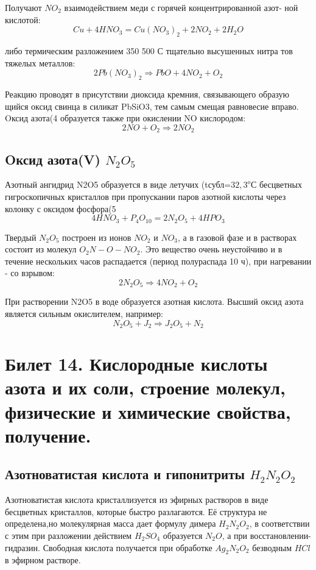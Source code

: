 \documentclass[11pt]{article}
\begin{document}
Получают $NO_2$ взаимодействием меди с горячей концентрированной азот‐ ной кислотой: 
$$Cu + 4HNO _3 = Cu(NO _3 ) _2 + 2NO _2 + 2H _2 O$$

либо термическим разложением 350 500 С тщательно высушенных нитра тов тяжелых металлов: 
$$2Pb(NO _3 ) _2 \Rightarrow PbO + 4NO _2 + O _2 $$

Реакцию проводят в присутствии диоксида кремния, связывающего образую щийся оксид свинца в силикат PbSiO3, тем самым смещая равновесие вправо. Oксид азота(4 образуется также при окислении NO кислородом: 
$$2NO + O _2 \Rightarrow 2NO _2 $$

\subsection{Oксид азота(V) $N_2O_5$}

 Азотный ангидрид N2O5 образуется в виде летучих (tсубл=$32,3 ^oС$ бесцветных гигроскопичных кристаллов при пропускании паров азотной кислоты через колонку с оксидом фосфора(5 
$$4HNO _3 + P _4 O_{10} = 2N _2 O _5 + 4HPO _3 $$

Твердый $N_2O_5$ построен из ионов $NO_2$ и $NO_3$, а в газовой фазе и в растворах состоит из молекул $O_2N-O-NO_2$. Это вещество очень неустойчиво и в течение нескольких часов распадается (период полураспада 10 ч), при нагревании - со взрывом: 
$$2N _2 O _5 \Rightarrow 4NO _2 + O _2 $$

При растворении N2O5 в воде образуется азотная кислота. Высший оксид азота является сильным окислителем, например: 
$$N_2O_5 + J_2 \Rightarrow J_2O_5 + N_2$$



\section{Билет 14. Кислородные кислоты азота и их соли, строение молекул, физические и химические свойства, получение.}
\subsection{Азотноватистая кислота и гипонитриты $H_2N_2O_2$}

Азотноватистая кислота кристаллизуется из эфирных растворов в виде
бесцветных кристаллов, которые быстро разлагаются. Её структура не
определена,но молекулярная масса дает формулу димера $H_2N_2O_2$,
в соответствии с этим при разложении действием $H_2SO_4$ образуется
$N_2O$, а при восстановлении- гидразин. Свободная кислота получается при
обработке $Ag_2N_2O_2$ безводным $HCl$ в эфирном растворе.
\end{document}
